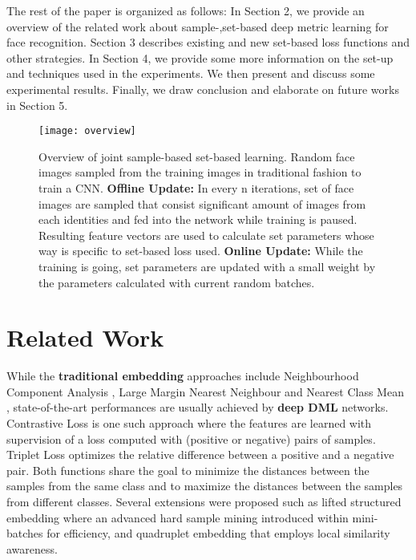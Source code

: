 \documentclass[10pt,twocolumn,letterpaper]{article}
\begin{document}
The rest of the paper is organized as follows: In Section 2, we provide an overview of the related work about sample-,set-based deep metric learning for face recognition. Section 3 describes existing and new set-based loss functions and other strategies. In Section 4, we provide some more information on the set-up and techniques used in the experiments. We then present and discuss some experimental results. Finally, we draw conclusion and elaborate on future works in Section 5.

\begin{figure*}[t]
\begin{center}
\texttt{[image: overview]}
\end{center}
\caption{Overview of joint sample-based set-based learning. Random face images sampled from the training images in traditional fashion to train a CNN. \textbf{Offline Update:} In every n iterations, set of face images are sampled that consist significant amount of images from each identities and fed into the network while training is paused. Resulting feature vectors are used to calculate set parameters whose way is specific to set-based loss used. \textbf{Online Update:} While the training is going, set parameters are updated with a small weight by the parameters calculated with current random batches.}
\label{fig:overview}
\end{figure*}

\section{Related Work}
While the \textbf{traditional embedding} approaches include Neighbourhood Component Analysis \cite{Goldberger2004}, Large Margin Nearest Neighbour \cite{weinberger2009distance} and Nearest Class Mean \cite{mensink2013distance}, state-of-the-art performances are usually achieved by \textbf{deep DML }networks. Contrastive Loss \cite{hadsell2006dimensionality} is one such approach where the features are learned with supervision of a loss computed with (positive or negative) pairs of samples. Triplet Loss \cite{weinberger2009distance} optimizes the relative difference between a positive and a negative pair. Both functions share the goal to minimize the distances between the samples from the same class and to maximize the distances between the samples from different classes. Several extensions were proposed such as lifted structured embedding \cite{oh2016deep} where an advanced hard sample mining introduced within mini-batches for efficiency, and quadruplet embedding \cite{huang2016local} that employs local similarity awareness.
\end{document}
